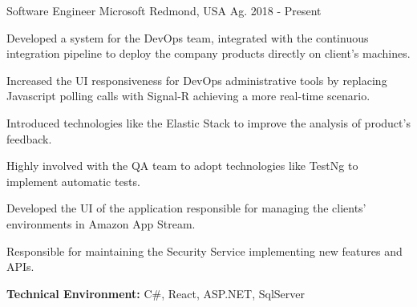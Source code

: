 
\begin{cventries}

\workexperienceentry
{Software Engineer} %
{Microsoft} %
{Redmond, USA} %
{Ag. 2018 - Present} %
{ %
\begin{cvitems}
    \item {Developed a system for the DevOps team, integrated with the continuous integration pipeline to deploy the company products directly on client's machines.}
    \item {Increased the UI responsiveness for DevOps administrative tools by replacing Javascript polling calls with Signal-R achieving a more real-time scenario.}
    \item {Introduced technologies like the Elastic Stack to improve the analysis of  product's feedback.}  
    \item {Highly involved with the QA team to adopt technologies like TestNg to implement automatic tests.}
    \item {Developed the UI of the application responsible for managing the clients' environments in Amazon App Stream.}
    \item {Responsible for maintaining the Security Service implementing new features and APIs.}
\end{cvitems}
}
{\textbf{Technical Environment:} C\#, React, ASP.NET, SqlServer}



\end{cventries}
